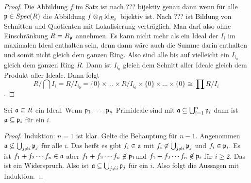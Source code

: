 \begin{proof}
	Die Abbildung \(f\) im Satz ist nach ??? bijektiv genau dann wenn für alle \(\mathfrak{p}\in Spec(R)\) die Abbildung 
	\(f\otimes_R \mathrm{id}_{R_{\mathfrak{p}}}\) bijektiv ist.
	Nach ??? ist Bildung von Schnitten und Quotienten mit Lokalisierung verträglich. Man darf also ohne Einschränkung \(R=R_{\mathfrak{p}}\) annehmen. Es kann nicht mehr als ein Ideal der \(I_i\) im maximalen Ideal enthalten sein, denn dann wäre auch die Summe darin enthalten und somit nicht gleich dem ganzen Ring.
	Also sind alle bis auf vielleicht ein \(I_{i_0}\) gleich dem ganzen Ring \(R\).
	Dann ist \(I_{i_0}\) gleich dem Schnitt aller Ideale gleich dem Produkt aller Ideale.
	Dann folgt 
	\[R/\bigcap I_i=R/I_{i_0}=\{0\}\times \dots\times R/I_{i_0}\times \{0\}\times\dots\times \{0\}\cong \prod R/I_i\].
\end{proof}
\begin{Lemma}[Primvermeidung]
	Sei \(\mathfrak{a}\subseteq R\) ein Ideal. Wenn \(\mathfrak{p}_1,\dots,\mathfrak{p}_n\) Primideale sind mit \(\mathfrak{a}\subseteq \bigcup_{i=1}^n\mathfrak{p}_i\) dann ist \(\mathfrak{a}\subseteq \mathfrak{p}_i\) für ein \(i\).
	
\end{Lemma}
\begin{proof}
	Induktion: \(n=1\) ist klar. Gelte die Behauptung für \(n-1\). Angenommen \(\mathfrak{a}\not\subseteq \bigcup_{j\neq i}\mathfrak{p}_j\) für alle \(i\). Das heißt es gibt \(f_i\in\mathfrak{a}\) mit \(f_i\not\in\bigcup_{j\neq i}\mathfrak{p}_j\) und \(f_i\in\mathfrak{p}_i\).
	Es ist \(f_1+f_2\cdots f_n\in\mathfrak{a}\) aber \(f_1+f_2\cdots f_n\not\in \mathfrak{p}_1\)und \(f_1+f_2\cdots f_n\not\in\mathfrak{p}_i\) für \(i\geq 2\). Das ist ein Widerspruch. Also ist \(\mathfrak{a}\subseteq \bigcup_{j\neq i}\mathfrak{p}_j\) für ein \(i\). Also folgt die Aussagen mit Induktion.
\end{proof}

